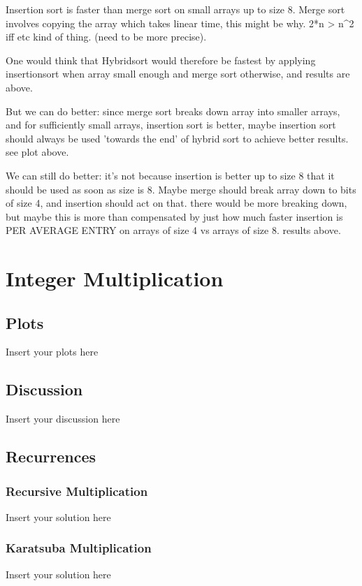 \documentclass[a4paper]{article}
\begin{document}
Insertion sort is faster than merge sort on small arrays up to size 8.
Merge sort involves copying the array which takes linear time, this might be why. 2*n > n^2 iff etc kind of thing. (need to be more precise).

One would think that Hybridsort would therefore be fastest by applying insertionsort when array small enough and merge sort otherwise, and results are above. 

But we can do better: since merge sort breaks down array into smaller arrays, and for sufficiently small arrays, insertion sort is better, maybe insertion sort should always be used 'towards the end' of hybrid sort to achieve better results. see plot above.

We can still do better: it's not because insertion is better up to size 8 that it should be used as soon as size is 8. Maybe merge should break array down to bits of size 4, and insertion should act on that. there would be more breaking down, but maybe this is more than compensated by just how much faster insertion is PER AVERAGE ENTRY on arrays of size 4 vs arrays of size 8. results above.

\section{Integer Multiplication}

\subsection{Plots}

\noindent Insert your plots here

\subsection{Discussion}

\noindent Insert your discussion here

\subsection{Recurrences}

\subsubsection{Recursive Multiplication}

\noindent Insert your solution here

\subsubsection{Karatsuba Multiplication}

\noindent Insert your solution here
\end{document}
